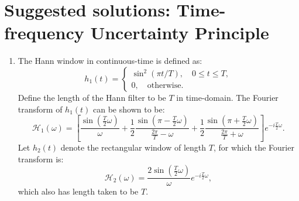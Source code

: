 
\newpage
\section{Suggested solutions: Time-frequency Uncertainty Principle}

\begin{enumerate}
  \item The Hann window in continuous-time is defined as:
        \[ h_{1}(t)=\begin{cases}
            \sin^{2}(\pi t/T), \quad 0\le t\le T, \\
            0, \quad \text{otherwise}.
          \end{cases} \]
        Define the length of the Hann filter to be $T$ in time-domain.
        The Fourier transform of $h_{1}(t)$ can be shown to be:
        \[ \mathcal{H}_{1}(\omega)=\left[\frac{\sin(\frac{T}{2}\omega)}{\omega}+\frac{1}{2}\frac{\sin(\pi-\frac{T}{2}\omega)}{\frac{2\pi}{T}-\omega}+\frac{1}{2}\frac{\sin(\pi+\frac{T}{2}\omega)}{\frac{2\pi}{T}+\omega}\right]e^{-i\frac{T}{2}\omega}. \]
        Let $h_{2}(t)$ denote the rectangular window of length $T$, for which the Fourier transform is:
        \[ \mathcal{H}_{2}(\omega)=\frac{2\sin(\frac{T}{2}\omega)}{\omega}e^{-i\frac{T}{2}\omega}, \]
        which also has length taken to be $T$.


\end{enumerate}
